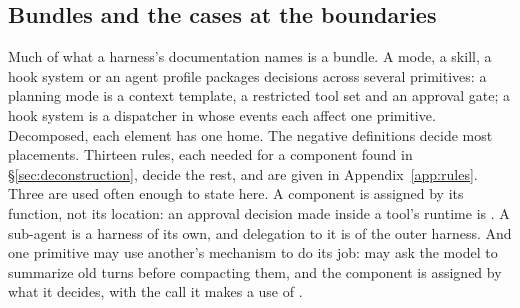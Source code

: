 \subsection{Bundles and the cases at the boundaries}
Much of what a harness's documentation names is a bundle. A mode, a skill, a hook system or an agent profile packages decisions across several primitives: a planning mode is a context template, a restricted tool set and an approval gate; a hook system is a dispatcher in  whose events each affect one primitive. Decomposed, each element has one home. The negative definitions decide most placements. Thirteen rules, each needed for a component found in \S\ref{sec:deconstruction}, decide the rest, and are given in Appendix~\ref{app:rules}. Three are used often enough to state here. A component is assigned by its function, not its location: an approval decision made inside a tool's runtime is . A sub-agent is a harness of its own, and delegation to it is  of the outer harness. And one primitive may use another's mechanism to do its job:  may ask the model to summarize old turns before compacting them, and the component is assigned by what it decides, with the call it makes a use of .
